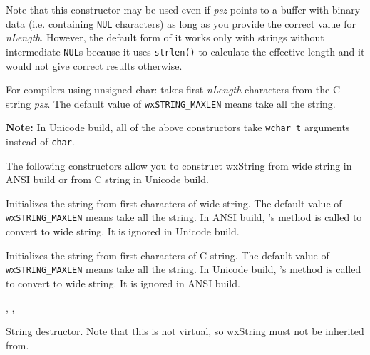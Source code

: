 Note that this constructor may be used even if {\it psz} points to a buffer
with binary data (i.e. containing {\tt NUL} characters) as long as you provide
the correct value for {\it nLength}. However, the default form of it works
only with strings without intermediate {\tt NUL}s because it uses 
{\tt strlen()} to calculate the effective length and it would not give correct
results otherwise.


For compilers using unsigned char: takes first {\it nLength} characters from the C string {\it psz}.
The default value of {\tt wxSTRING\_MAXLEN} means take all the string.

{\bf Note:} In Unicode build, all of the above constructors take
{\tt wchar\_t} arguments instead of {\tt char}.


The following constructors allow you to construct wxString from wide string
in ANSI build or from C string in Unicode build.


Initializes the string from first  characters of wide string. 
The default value of {\tt wxSTRING\_MAXLEN} means take all the string.
In ANSI build, 's 
 method is called to
convert  to wide string. It is ignored in Unicode build.


Initializes the string from first  characters of C string.
The default value of {\tt wxSTRING\_MAXLEN} means take all the string.
In Unicode build, 's 
 method is called to
convert  to wide string. It is ignored in ANSI build.


, ,

\label{wxstringdestruct}


String destructor. Note that this is not virtual, so wxString must not be inherited from.

